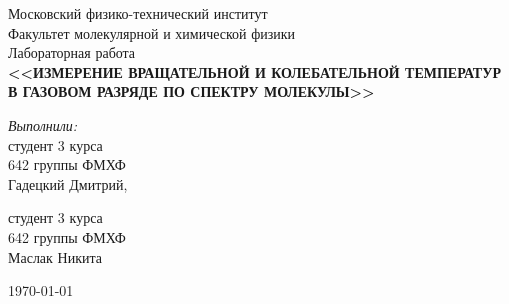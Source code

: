 \begin{titlepage}
\begin{center} 
 
\large Московский физико-технический институт\\
Факультет молекулярной и химической физики\\
\vspace{7cm}
\huge Лабораторная работа\\
\textbf{\Large <<ИЗМЕРЕНИЕ ВРАЩАТЕЛЬНОЙ И
	КОЛЕБАТЕЛЬНОЙ ТЕМПЕРАТУР
	В ГАЗОВОМ РАЗРЯДЕ
	ПО СПЕКТРУ МОЛЕКУЛЫ>>}\\
\end{center} 

\vspace{7.5cm}
{\par \raggedleft \large \emph{Выполнили:}\\ 
	студент 3 курса\\ 
	642 группы ФМХФ\\ 
	Гадецкий Дмитрий, \par
	студент 3 курса\\ 
	642 группы ФМХФ\\ 
	Маслак Никита \par
}
\begin{center}
\vfill \today
\date \today
\end{center}
\end{titlepage}
\newpage
